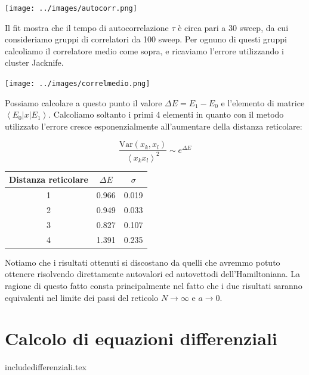 \documentclass[a4paper,10pt]{article}
\begin{document}
\begin{center}
 \texttt{[image: ../images/autocorr.png]}
\end{center}

Il fit mostra che il tempo di autocorrelazione $\tau$ è circa pari a 30 sweep, da cui consideriamo gruppi di correlatori da 100 sweep. Per ognuno di questi gruppi calcoliamo il correlatore medio come sopra, e ricaviamo l'errore utilizzando i cluster Jacknife.

\begin{center}
 \texttt{[image: ../images/correlmedio.png]}
\end{center}

Possiamo calcolare a questo punto il valore $\Delta E=E_1-E_0$ e l'elemento di matrice $\left<E_0|x|E_1\right>$. Calcoliamo soltanto i primi 4 elementi in quanto con il metodo utilizzato l'errore cresce esponenzialmente all'aumentare della distanza reticolare:

$$\frac{\text{Var}(x_k, x_l)}{\left<x_k x_l\right>^2} \sim e^{\Delta E}$$

\begin{center}
\begin{tabular}{c|c|c}
\hline
Distanza reticolare & $\Delta E$ & $\sigma$ \\
\hline
1 & 0.966 & 0.019\\
2&0.949&0.033 \\
3&0.827 &0.107 \\
4&1.391 &0.235 \\
\hline
\end{tabular}
\end{center}

Notiamo che i risultati ottenuti si discostano da quelli che avremmo potuto ottenere risolvendo direttamente autovalori ed autovettodi dell'Hamiltoniana. La ragione di questo fatto consta principalmente nel fatto che i due risultati saranno equivalenti nel limite dei passi del reticolo $N\to\infty$ e $a\to0$.


\section{Calcolo di equazioni differenziali}

include{differenziali.tex}
\end{document}
